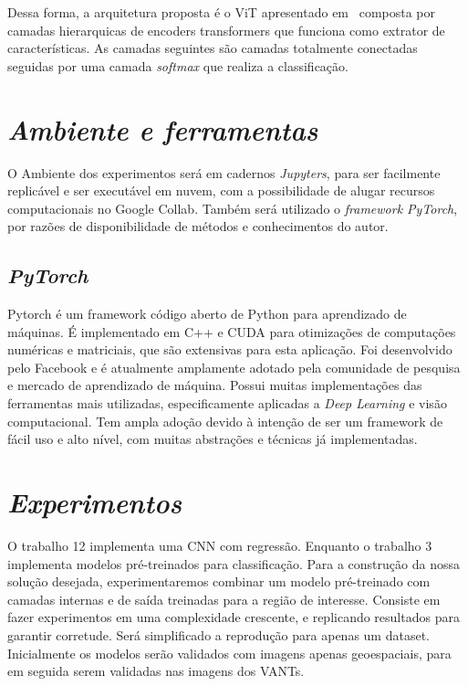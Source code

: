 Dessa forma, a arquitetura proposta é o ViT apresentado em~\cite{wang2022empirical}
composta por camadas hierarquicas de encoders transformers  que funciona como extrator de características. As camadas seguintes são camadas totalmente conectadas seguidas por uma camada \textit{softmax} que realiza a classificação.

\section{\textit{Ambiente e ferramentas}}\label{sec:Cap3_Ferramentas}


O Ambiente dos experimentos será em cadernos \textit{Jupyters}, para ser facilmente replicável e ser executável em nuvem, com a possibilidade de alugar recursos computacionais no Google Collab. Também será utilizado o \textit{framework PyTorch}, por razões de disponibilidade de métodos e conhecimentos do autor.

\subsection{\textit{PyTorch}}\label{sec:Cap2_PyTorch}
Pytorch é um framework código aberto de Python para aprendizado de máquinas. É implementado em C++ e CUDA para otimizações de computações numéricas e matriciais, que são extensivas para esta aplicação.
Foi desenvolvido pelo Facebook e é atualmente amplamente adotado pela comunidade de pesquisa e mercado de aprendizado de máquina. Possui muitas implementações das ferramentas mais utilizadas, especificamente aplicadas a \textit{Deep Learning} e visão computacional. Tem ampla adoção devido à intenção de ser um framework de fácil uso e alto nível, com muitas abstrações e técnicas já implementadas.




\section{\textit{Experimentos}}\label{sec:Cap3_Experimentos}

O trabalho 12 implementa uma CNN com regressão. Enquanto o trabalho 3 implementa modelos pré-treinados para classificação. Para a construção da nossa solução desejada, experimentaremos combinar um modelo pré-treinado com camadas internas e de saída treinadas para a região de interesse.
Consiste em fazer experimentos em uma complexidade crescente, e replicando resultados para garantir corretude. Será simplificado a reprodução para apenas um dataset.
Inicialmente os modelos serão validados com imagens apenas geoespaciais, para em seguida serem validadas nas imagens dos VANTs.

